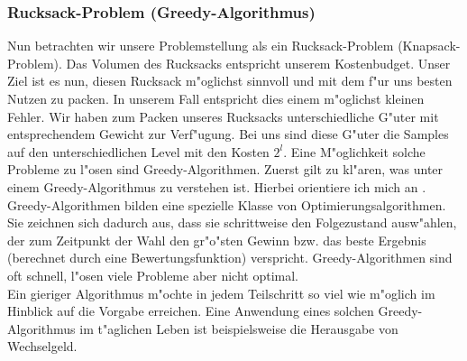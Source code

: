\subsubsection{Rucksack-Problem (Greedy-Algorithmus)}
Nun betrachten wir unsere Problemstellung als ein Rucksack-Problem (Knapsack-Problem). Das Volumen des Rucksacks entspricht unserem Kostenbudget. Unser Ziel ist es nun, diesen Rucksack m"oglichst sinnvoll und mit dem f"ur uns besten Nutzen zu packen. In unserem Fall entspricht dies einem m"oglichst kleinen Fehler. Wir haben zum Packen unseres Rucksacks unterschiedliche G"uter mit entsprechendem Gewicht zur Verf"ugung. Bei uns sind diese G"uter die Samples auf den unterschiedlichen Level mit den Kosten $2^l$.
Eine M"oglichkeit solche Probleme zu l"osen sind Greedy-Algorithmen.
Zuerst gilt zu kl"aren, was unter einem Greedy-Algorithmus zu verstehen ist. Hierbei orientiere ich mich an \cite{Greedy}.\\
Greedy-Algorithmen bilden eine spezielle Klasse von Optimierungsalgorithmen. Sie zeichnen sich dadurch aus, dass sie schrittweise den Folgezustand ausw"ahlen, der zum Zeitpunkt der Wahl den gr"o"sten Gewinn bzw. das beste Ergebnis (berechnet durch eine Bewertungsfunktion) verspricht. Greedy-Algorithmen sind oft schnell, l"osen viele Probleme aber nicht optimal.\\[0,1cm]

Ein gieriger Algorithmus m"ochte in jedem Teilschritt so viel wie m"oglich im Hinblick auf die Vorgabe erreichen. Eine Anwendung eines solchen Greedy-Algorithmus im t"aglichen Leben ist beispielsweise die Herausgabe von Wechselgeld.\\[0,1cm]

